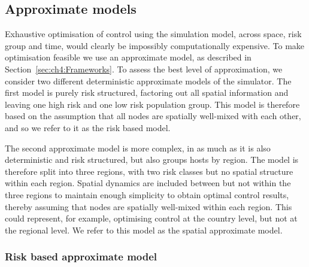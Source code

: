 \subsection{Approximate models}

Exhaustive optimisation of control using the simulation model, across space, risk group and time, would clearly be impossibly computationally expensive. To make optimisation feasible we use an approximate model, as described in Section~\ref{sec:ch4:Frameworks}. To assess the best level of approximation, we consider two different deterministic approximate models of the simulator. The first model is purely risk structured, factoring out all spatial information and leaving one high risk and one low risk population group. This model is therefore based on the assumption that all nodes are spatially well-mixed with each other, and so we refer to it as the risk based model.

The second approximate model is more complex, in as much as it is also deterministic and risk structured, but also groups hosts by region. The model is therefore split into three regions, with two risk classes but no spatial structure within each region. Spatial dynamics are included between but not within the three regions to maintain enough simplicity to obtain optimal control results, thereby assuming that nodes are spatially well-mixed within each region. This could represent, for example, optimising control at the country level, but not at the regional level. We refer to this model as the spatial approximate model.

\subsubsection*{Risk based approximate model}

